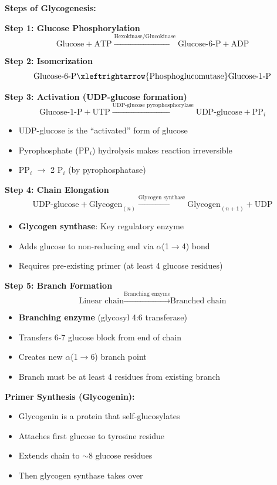 \textbf{Steps of Glycogenesis:}

\textbf{Step 1: Glucose Phosphorylation}
\[
\text{Glucose} + \text{ATP} \xrightarrow{\text{Hexokinase/Glucokinase}} \text{Glucose-6-P} + \text{ADP}
\]

\textbf{Step 2: Isomerization}
\[
\text{Glucose-6-P} \xleftrightarrow{\text{Phosphoglucomutase}} \text{Glucose-1-P}
\]

\textbf{Step 3: Activation (UDP-glucose formation)}
\[
\text{Glucose-1-P} + \text{UTP} \xrightarrow{\text{UDP-glucose pyrophosphorylase}} \text{UDP-glucose} + \text{PP}_i
\]
\begin{itemize}
    \item UDP-glucose is the ``activated'' form of glucose
    \item Pyrophosphate (PP$_i$) hydrolysis makes reaction irreversible
    \item PP$_i$ $\rightarrow$ 2 P$_i$ (by pyrophosphatase)
\end{itemize}

\textbf{Step 4: Chain Elongation}
\[
\text{UDP-glucose} + \text{Glycogen}_{(n)} \xrightarrow{\text{Glycogen synthase}} \text{Glycogen}_{(n+1)} + \text{UDP}
\]
\begin{itemize}
    \item \textbf{Glycogen synthase}: Key regulatory enzyme
    \item Adds glucose to non-reducing end via $\alpha$(1$\rightarrow$4) bond
    \item Requires pre-existing primer (at least 4 glucose residues)
\end{itemize}

\textbf{Step 5: Branch Formation}
\[
\text{Linear chain} \xrightarrow{\text{Branching enzyme}} \text{Branched chain}
\]
\begin{itemize}
    \item \textbf{Branching enzyme} (glycosyl 4:6 transferase)
    \item Transfers 6-7 glucose block from end of chain
    \item Creates new $\alpha$(1$\rightarrow$6) branch point
    \item Branch must be at least 4 residues from existing branch
\end{itemize}

\textbf{Primer Synthesis (Glycogenin):}
\begin{itemize}
    \item Glycogenin is a protein that self-glucosylates
    \item Attaches first glucose to tyrosine residue
    \item Extends chain to $\sim$8 glucose residues
    \item Then glycogen synthase takes over
\end{itemize}

